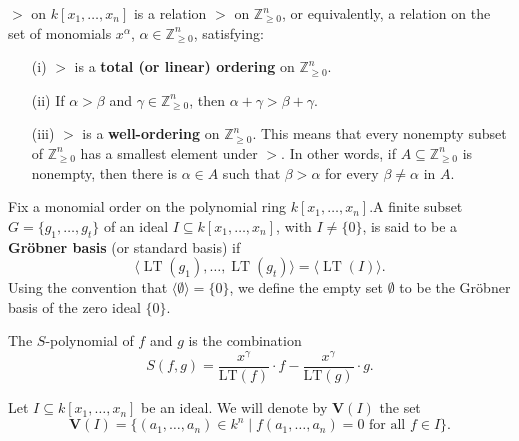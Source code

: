\begin{definition}\label{MonomialOrder}
  \leanok
  \( > \) on \( k[x_1, \ldots, x_n] \) is a relation \( > \) on \( \mathbb{Z}_{\geq 0}^n \), or equivalently, a relation on the set of monomials \( x^\alpha \), \( \alpha \in \mathbb{Z}_{\geq 0}^n \), satisfying:

  \begin{enumerate}
      \item[(i)] \( > \) is a \textbf{total (or linear) ordering} on \( \mathbb{Z}_{\geq 0}^n \).

      \item[(ii)] If \( \alpha > \beta \) and \( \gamma \in \mathbb{Z}_{\geq 0}^n \), then \( \alpha + \gamma > \beta + \gamma \).

      \item[(iii)] \( > \) is a \textbf{well-ordering} on \( \mathbb{Z}_{\geq 0}^n \). This means that every nonempty subset of \( \mathbb{Z}_{\geq 0}^n \) has a smallest element under \( > \). In other words, if \( A \subseteq \mathbb{Z}_{\geq 0}^n \) is nonempty, then there is \( \alpha \in A \) such that \( \beta > \alpha \) for every \( \beta \neq \alpha \) in \( A \).
  \end{enumerate}
\end{definition}

\begin{definition}\label{IsGroebnerBasis}
  \leanok
  Fix a monomial order on the polynomial ring $k[x_1, \ldots, x_n]$.A finite subset $G = \{g_1, \ldots, g_t\}$ of an ideal $I \subseteq k[x_1, \ldots, x_n]$, with $I \ne \{0\}$, is said to be a \textbf{Gröbner basis} (or standard basis) if
  \[
  \langle \operatorname{LT}(g_1), \ldots, \operatorname{LT}(g_t) \rangle = \langle \operatorname{LT}(I) \rangle.
  \]
  Using the convention that $\langle \emptyset \rangle = \{0\}$, we define the empty set $\emptyset$ to be the Gröbner basis of the zero ideal $\{0\}$.
\end{definition}

\begin{definition}\label{S Polynomial}
  \leanok
  The $S$-polynomial of $f$ and $g$ is the combination
  \[
  S(f, g) = \frac{x^\gamma}{\mathrm{LT}(f)} \cdot f - \frac{x^\gamma}{\mathrm{LT}(g)} \cdot g.
  \]
\end{definition}

\begin{definition}\label{Variety}
  Let \( I \subseteq k[x_1, \ldots, x_n] \) be an ideal. We will denote by \( \mathbf{V}(I) \) the set
  \[
  \mathbf{V}(I) = \{(a_1, \ldots, a_n) \in k^n \mid f(a_1, \ldots, a_n) = 0 \text{ for all } f \in I\}.
  \]
\end{definition}


